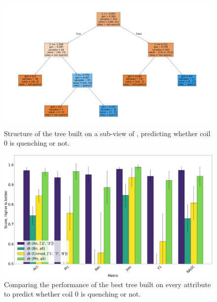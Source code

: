 \begin{figure}[!ht]
	\centering
	\includegraphics[width=\linewidth]{img/An_2_3_qlp_c0.png}
	\caption{Structure of the tree built on a sub-view of \an, predicting whether coil $0$ is
		quenching or not.} \label{fig:qlp-coil0-bdt}
\end{figure}

\begin{figure}[!ht]
	\centering
	\includegraphics[width=\linewidth]{img/coil0_dt_performance.png}
	\caption{Comparing the performance of the best tree built on every attribute to predict
		whether coil $0$ is quenching or not.} \label{fig:bdts-coil0}
\end{figure}








